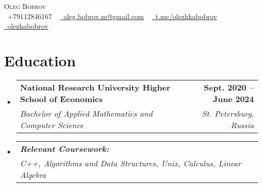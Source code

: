 \documentclass[letterpaper,11pt]{article}
\makeatletter
\newcommand{\resumeSubheading}[4]{
  \vspace{-2pt}\item
    \begin{tabular*}{1.0\textwidth}[t]{l@{\extracolsep{\fill}}r}
      \textbf{#1} & \textbf{\large #2} \\
      \textit{\large#3} & \textit{\large #4} \\
    \end{tabular*}\vspace{-7pt}
}
\newcommand{\resumeSubHeadingListStart}{\begin{itemize}[leftmargin=0.0in, label={}]}
\newcommand{\resumeSubHeadingListEnd}{\end{itemize}}
\makeatother
\begin{document}

\begin{center}
    {\Huge \scshape Oleg Bobrov} \\ \vspace{1pt}
    \small \raisebox{-0.1\height}\faPhone\ +79112846167 ~ \href{mailto:oleg.bobrov.m@gmail.com}{\raisebox{-0.2\height}\faEnvelope\  \underline{oleg.bobrov.m@gmail.com}} ~ 
    \href{https://t.me/olezhkabobrov//}{\raisebox{-0.2\height}\faTelegram\ \underline{t.me/olezhkabobrov}}  ~
    \href{https://github.com/olezhabobrov}{\raisebox{-0.2\height}\faGithub\ \underline{olezhabobrov}}
    \vspace{-8pt}
\end{center}


\section{Education}
  \resumeSubHeadingListStart
    \resumeSubheading
      {\large{National Research University Higher School of Economics}}{Sept. 2020 -- June 2024 }
      {\large{Bachelor of Applied Mathematics and Computer Science}}{St. Petersburg, Russia}
    \resumeSubheading
        {\textit{Relevant Coursework:}}{}
        {C++, Algorithms and Data Structures,  Unix,  Calculus, Linear Algebra}{}
  \resumeSubHeadingListEnd

 
\end{document}
